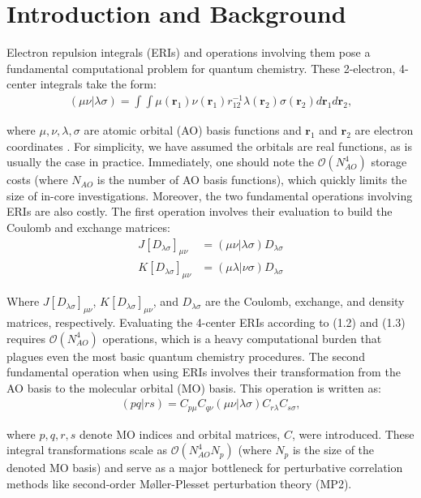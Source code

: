 \chapter{Introduction and Background}

Electron repulsion integrals (ERIs) and operations involving them pose a fundamental
computational problem for quantum chemistry. These 2-electron, 4-center integrals take the form:
\begin{align}(\mu \nu | \lambda \sigma) = \int \int \mu(\textbf{r}_{1}) 
\nu(\textbf{r}_{1}) r^{-1}_{12} \lambda(\textbf{r}_{2}) \sigma(\textbf{r}_{2}) 
d{\textbf{r}_{1}}d{\textbf{r}_{2}},
\end{align}

\noindent where $\mu, \nu, \lambda, \sigma$ are atomic orbital (AO) basis functions and $\textbf{r}_{1}$ and $\textbf{r}_{2}$
are electron coordinates \cite{ref1}. For simplicity, we have assumed the orbitals are real functions, as is usually
the case in practice. Immediately, one should note the $\mathcal{O}(N_{AO}^4)$ storage costs (where $N_{AO}$ is
the number of AO basis functions), which quickly 
limits the size of in-core investigations. Moreover, the two fundamental operations involving ERIs 
are also costly. The first operation involves their evaluation to build the Coulomb and exchange matrices:
\begin{align}
J[D_{\lambda \sigma}]_{\mu \nu} &= (\mu \nu|\lambda \sigma)D_{\lambda \sigma} \\
K[D_{\lambda \sigma}]_{\mu \nu} &= (\mu \lambda|\nu \sigma)D_{\lambda \sigma}
\end{align}

\noindent Where $J[D_{\lambda \sigma}]_{\mu \nu}$, $K[D_{\lambda \sigma}]_{\mu \nu}$, 
and $D_{\lambda \sigma}$ are the Coulomb, exchange, and density matrices, respectively.
Evaluating the 4-center ERIs according to (1.2) and (1.3) requires $\mathcal{O}(N_{AO}^4)$ operations, 
which is a heavy computational burden that plagues even the most basic quantum chemistry procedures. 
The second fundamental operation when using ERIs involves their transformation from the AO basis 
to the molecular orbital (MO) basis. This operation is written as:
\begin{align}
(pq | rs) = C_{p \mu}C_{q \nu}
(\mu \nu | \lambda \sigma)C_{r\lambda}C_{s\sigma},
\end{align} 

\noindent where $p,q,r,s$ denote MO indices and orbital matrices, $C$, were introduced. These integral transformations scale 
as $\mathcal{O}(N_{AO}^4N_p)$ (where $N_p$ is the size of the denoted MO basis) and serve as a major 
bottleneck for perturbative correlation methods like second-order M{\o}ller-Plesset perturbation theory (MP2).

